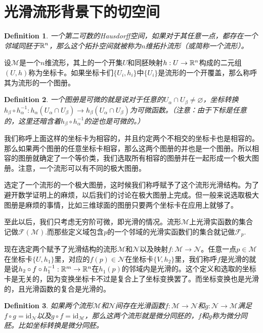 \documentclass[11pt]{extbook}
\theoremstyle{plain}%
\newtheorem{defi}{Definition}[section]%
\begin{document}
\section{光滑流形背景下的切空间}
\begin{defi}
一个第二可数的Hausdorff空间，如果对于其任意一点，都存在一个邻域同胚于$\mathbb{R}^n$，那么这个拓扑空间就被称为$n$维拓扑流形（或简称一个流形）。
\end{defi}
设$\mathcal{M}$是一个$n$维流形，其上的一个开集$U$和同胚映射$h:U\to \mathbb{R}^n$构成的二元组$(U,h)$称为坐标卡。如果坐标卡们$\{U_i,h_i\}$中$\{U_i\}$是流形的一个开覆盖，那么称呼其为流形的一个图册。
\begin{defi}
一个图册是可微的就是说对于任意的$U_\alpha \cap U_{\beta}\neq \varnothing$，坐标转换$h_\beta\circ h_\alpha^{-1}: h_\alpha(U_\alpha\cap U_\beta) \to h_\beta(U_\alpha\cap U_\beta)$为可微函数。（注意：由于下标是任意的，这里还暗含着$h_\beta\circ h_\alpha^{-1}$的逆也是可微的。）
\end{defi}

我们称呼上面这样的坐标卡为相容的，并且约定两个不相交的坐标卡也是相容的。那么如果两个图册的任意坐标卡相容，那么这两个图册的并也是一个图册。所以相容的图册就确定了一个等价类，我们选取所有相容的图册并在一起形成一个极大图册。注意，一个流形可以有不同的极大图册。

选定了一个流形的一个极大图册，这时候我们称呼赋予了这个流形光滑结构。为了避开数学证明上的麻烦，以后我们的讨论在极大图册上完成。但一般来说选取极大图册是麻烦的事情，比如三维球面的图册只要两个坐标卡在应用上就够了。

至此以后，我们只考虑无穷阶可微，即光滑的情况。流形$\mathcal{M}$上光滑实函数的集合记做$\mathcal{F}(\mathcal{M})$.而那些定义域包含$p$的一个邻域的光滑实函数们的集合就记做$\mathcal{F}_p$.

现在选定两个赋予了光滑结构的流形$\mathcal{M}$和$\mathcal{N}$以及映射$f:\mathcal{M}\to \mathcal{N}$。任意一点$p\in \mathcal{M}$在坐标卡$\{U,h_1\}$里，对应的$f(p)\in \mathcal{N}$在坐标卡$\{V,h_2\}$里，我们称呼$f$是光滑的就是说$h_2 \circ f\circ h_1^{-1}:\mathbb{R}^m\to \mathbb{R}^n$在$h_1(p)$的邻域内是光滑的。这个定义和选取的坐标卡是无关的，因为变换坐标卡不过是复合上了坐标变换罢了。而坐标变换也是光滑的，且光滑函数的复合是光滑的。
\begin{defi}
如果两个流形$\mathcal{M}$和$\mathcal{N}$间存在光滑函数$f:\mathcal{M}\to \mathcal{N}$和$g:\mathcal{N}\to \mathcal{M}$满足$f\circ g =\mathrm{id}_\mathcal{N}$以及$g\circ f =\mathrm{id}_\mathcal{M}$，那么这两个流形就是微分同胚的，$f$和$g$称为微分同胚。比如坐标转换是微分同胚。
\end{defi}
\end{document}
